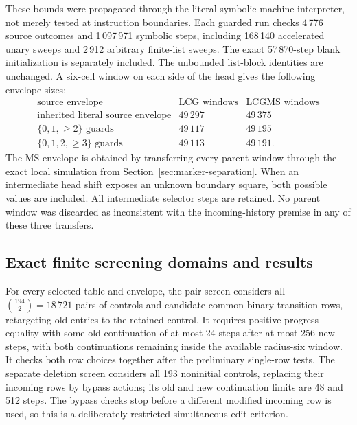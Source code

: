 These bounds were propagated through the literal symbolic machine
interpreter, not merely tested at instruction boundaries.  Each guarded
run checks 4\,776 source outcomes and 1\,097\,971 symbolic steps, including
168\,140 accelerated unary sweeps and 2\,912 arbitrary finite-list sweeps.
The exact 57\,870-step blank initialization is separately included.  The
unbounded list-block identities are unchanged.  A six-cell window on each
side of the head gives the following envelope sizes:
\[
\begin{array}{lrr}
\text{source envelope}&\text{LCG windows}&\text{LCGMS windows}\\\hline
\text{inherited literal source envelope}&49\,297&49\,375\\
\{0,1,{\geq}2\}\text{ guards}&49\,117&49\,195\\
\{0,1,2,{\geq}3\}\text{ guards}&49\,113&49\,191.
\end{array}
\]
The MS envelope is obtained by transferring every parent window through
the exact local simulation from Section~\ref{sec:marker-separation}.
When an intermediate head shift exposes an unknown boundary square,
both possible values are included.  All intermediate selector steps
are retained.  No parent window was discarded as inconsistent with the
incoming-history premise in any of these three transfers.

\subsection{Exact finite screening domains and results}
For every selected table and envelope, the pair screen considers all
$\binom{194}{2}=18\,721$ pairs of controls and candidate common binary
transition rows, retargeting old entries to the retained control.  It
requires positive-progress equality with some old continuation of at most
24 steps after at most 256 new steps, with both continuations remaining
inside the available radius-six window.  It checks both row choices
together after the preliminary single-row tests.  The separate deletion
screen considers all 193 noninitial controls, replacing their incoming
rows by bypass actions; its old and new continuation limits are 48 and
512 steps.  The bypass checks stop before a different modified incoming
row is used, so this is a deliberately restricted simultaneous-edit
criterion.

